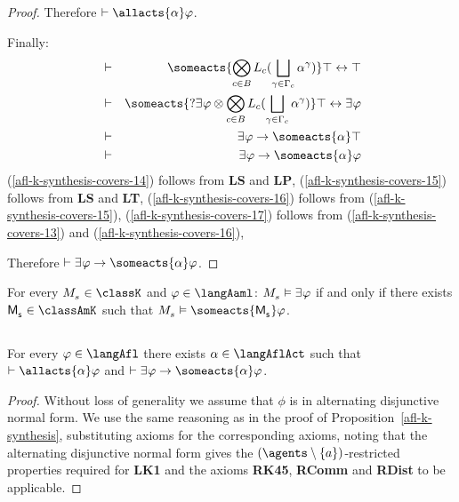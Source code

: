 \begin{proof}
    Therefore $\proves \allacts{\alpha} \phi$.

    Finally:
    \begin{eqnarray}
    &\proves& \someacts{\bigcompose_{\agentC \in \agentsB} \learns_\agentC (\bigchoice_{\gamma \in \Gamma_\agentC} \alpha^\gamma)} \top \iff \top\label{afl-k-synthesis-covers-14}\\
    &\proves& \someacts{\test{\somerefs \phi} \compose \bigcompose_{\agentC \in \agentsB} \learns_\agentC (\bigchoice_{\gamma \in \Gamma_\agentC} \alpha^\gamma)} \top \iff \somerefs \phi\label{afl-k-synthesis-covers-15}\\
    &\proves& \somerefs \phi \implies \someacts{\alpha} \top\label{afl-k-synthesis-covers-16}\\
    &\proves& \somerefs \phi \implies \someacts{\alpha} \phi\label{afl-k-synthesis-covers-17}
    \end{eqnarray}
    (\ref{afl-k-synthesis-covers-14}) follows from {\bf LS} and {\bf LP},
    (\ref{afl-k-synthesis-covers-15}) follows from {\bf LS} and {\bf LT},
    (\ref{afl-k-synthesis-covers-16}) follows from (\ref{afl-k-synthesis-covers-15}),
    (\ref{afl-k-synthesis-covers-17}) follows from (\ref{afl-k-synthesis-covers-13}) and (\ref{afl-k-synthesis-covers-16}),

    Therefore $\proves \somerefs \phi \implies \someacts{\alpha} \phi$.
\end{proof}

\begin{corollary}
    For every $\kPModel{\kStateS} \in \classK$ and $\phi \in \langAaml$: $\kPModel{\kStateS} \entails \somerefs \phi$ if and only if there exists $\aPModel{\aStateS} \in \classAmK$ such that $\kPModel{\kStateS} \entails \someacts{\aPModel{\aStateS}} \phi$.
\end{corollary}

\subsection{\classKFF{}}

\begin{proposition}\label{afl-kff-synthesis}
    For every $\phi \in \langAfl$ there exists $\alpha \in \langAflAct$ such that $\proves \allacts{\alpha} \phi$ and $\proves \somerefs \phi \implies \someacts{\alpha} \phi$.
\end{proposition} 

\begin{proof}
    Without loss of generality we assume that $\phi$ is in alternating disjunctive normal form.
    We use the same reasoning as in the proof of Proposition~\ref{afl-k-synthesis}, substituting \axiomAflKFF{} axioms for the corresponding \axiomAflK{} axioms, noting that the alternating disjunctive normal form gives the $(\agents \setminus \{\agentA\})$-restricted properties required for {\bf LK1} and the \axiomRmlKFF{} axioms {\bf RK45}, {\bf RComm} and  {\bf RDist} to be applicable.
\end{proof}

